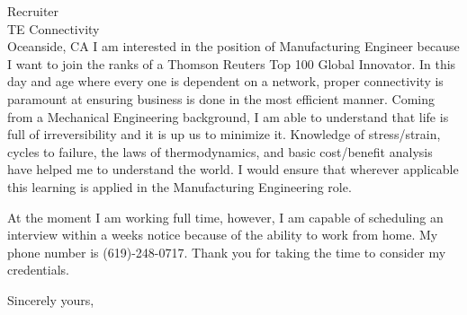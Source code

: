 \documentclass{letter} %
\begin{document}
\begin{letter}{Recruiter \\
TE Connectivity \\
Oceanside, CA}
\noindent I am interested in the position of Manufacturing Engineer because I want to join the ranks of a Thomson Reuters Top 100 Global Innovator.  In this day and age where every one is dependent on a network, proper connectivity is paramount at ensuring business is done in the most efficient manner.  Coming from a Mechanical Engineering background, I am able to understand that life is full of irreversibility and it is up us to minimize it.  Knowledge of stress/strain, cycles to failure, the laws of thermodynamics, and basic cost/benefit analysis have helped me to understand the world.  I would ensure that wherever applicable this learning is applied in the Manufacturing Engineering role.

\noindent At the moment I am working full time, however, I am capable of scheduling an interview within a weeks notice because of the ability to work from home.  My phone number is (619)-248-0717.  Thank you for taking the time to consider my credentials.
 
\closing{Sincerely yours,} 
 

 

\end{letter}
 
\end{document}
